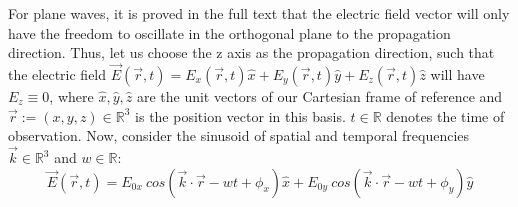 \documentclass[11pt, a4paper, twoside]{article} %
\newcommand{\R}{\mathbb{R}} %
\begin{document}
For plane waves, it is proved in the full text that the electric field vector will only have the freedom to oscillate in the orthogonal plane to the propagation direction. Thus, let us choose the z axis as the propagation direction, such that the electric field $\vec{E}(\vec{r},t)=E_x(\vec{r},t)\hat{x}+E_y(\vec{r},t)\hat{y}+E_z(\vec{r},t)\hat{z}$ will have $E_z\equiv  0$, where $\hat{x},\hat{y},\hat{z}$ are the unit vectors of our Cartesian frame of reference and $\vec{r}:=(x,y,z)\in\R^3$ is the position vector in this basis. $t\in\R$ denotes the time of observation. Now, consider the sinusoid of spatial and temporal frequencies $\vec{k}\in\R^3$ and $w\in\R$:
\begin{equation}
\vec{E}(\vec{r},t)=E_{0x}\ cos(\vec{k}\cdot\vec{r}-wt+\phi_x)\hat{x}+ E_{0y}\ cos(\vec{k}\cdot\vec{r}-wt+\phi_y)\hat{y}
\end{equation} 
\end{document}
